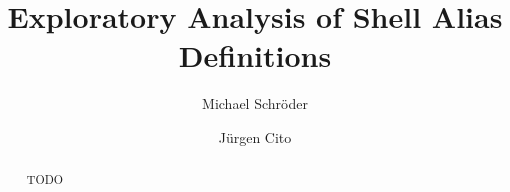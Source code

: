 \documentclass[sigconf,review]{acmart}
\begin{document}
\title{Exploratory Analysis of Shell Alias Definitions}

\author{Michael Schröder}

\author{Jürgen Cito}

\begin{abstract}
	TODO
\end{abstract}

\maketitle
















%
\end{document}
